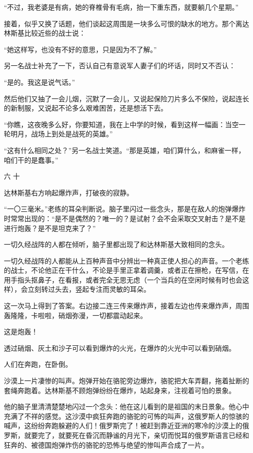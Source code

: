“不过，我老婆是有病，她的脊椎骨有毛病，抬一下重东西，就要躺几个星期。”

接着，似乎又换了话题，他们谈起这周围是一块多么可恨的缺水的地方。那个离达林斯基比较近些的战士说：

“她这样写，也没有不好的意思，只是因为不了解。”

另一名战士补充了一下，否认自己有意说军人妻子们的坏话，同时又不否认：

“是的。我这是说气话。”

然后他们又抽了一会儿烟，沉默了一会儿，又说起保险刀片多么不保险，说起连长的新制服，又说起不论多么艰难困苦，还是想活下去。

“你瞧，这夜晚多么好，你要知道，我在上中学的时候，看到这样一幅画：当空一轮明月，战场上到处是战死的英雄。”

“这有什么相同之处？”另一名战士笑道。“那是英雄，咱们算什么，和麻雀一样，咱们干的是蠢事。”

六 十

达林斯基右方响起爆炸声，打破夜的寂静。

“一〇三毫米。”老练的耳朵判断说。脑子里闪过一些念头，那是在敌人的炮弹爆炸时常常出现的：“是不是偶然的？唯一的？是试射？会不会采取交叉射击？是不是进行炮轰？是不是坦克来了？”

一切久经战阵的人都在倾听，脑子里都出现了和达林斯基大致相同的念头。

一切久经战阵的人都能从上百种声音中分辨出一种真正使人担心的声音。一个老练的战士，不论他正在干什么，不论是手里正拿着调羹，或者正在擦枪，在写信，在用手指头抠鼻子，在看报，或者完全无思无虑（一个当兵的在空闲时候有时也会这样），会立刻转过头去，竖起专注而灵敏的耳朵。

这一次马上得到了答案。右边接二连三传来爆炸声，接着左边也传来爆炸声，周围轰隆隆，卡啦啦，硝烟弥漫，一切都震动起来。

这是炮轰！

透过硝烟、灰土和沙子可以看到爆炸的火光，在爆炸的火光中可以看到硝烟。

人们在奔跑，在卧倒。

沙漠上一片凄惨的叫声。炮弹开始在骆驼旁边爆炸，骆驼把大车弄翻，拖着扯断的套绳奔跑着。达林斯基不顾炮弹纷纷在爆炸，站起身来，注视着可怕的景象。

他的脑子里清清楚楚地闪过一个念头：他在这儿看到的是祖国的末日景象。他心中充满了不祥的感觉。这沙漠中疯狂奔跑的骆驼的可怖的叫声，这俄罗斯人的惊骇的喊声，这纷纷奔跑躲避的人们！俄罗斯完了！被赶到靠近亚洲的寒冷的沙漠上的俄罗斯，就要完了，就要死在昏沉而静谧的月光下，亲切而悦耳的俄罗斯语言已经和狂奔的、被德国炮弹炸伤的骆驼的恐怖与绝望的惨叫声合成了一片。

